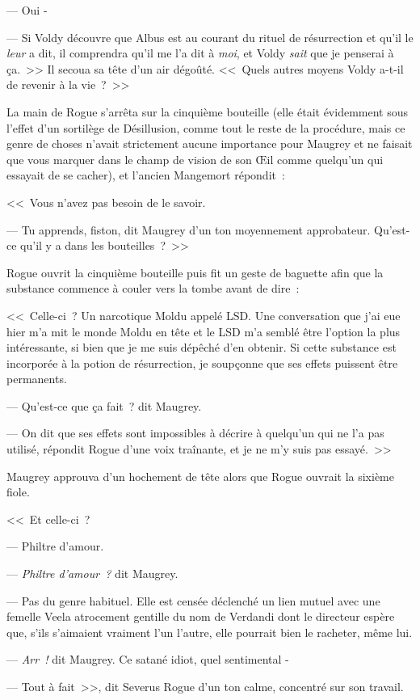--- Oui -

--- Si Voldy découvre que Albus est au courant du rituel de résurrection et qu'il le \emph{leur} a dit, il comprendra qu'il me l'a dit à \emph{moi}, et Voldy \emph{sait} que je penserai à ça.~>> Il secoua sa tête d'un air dégoûté. <<~Quels autres moyens Voldy a-t-il de revenir à la vie~?~>>

La main de Rogue s'arrêta sur la cinquième bouteille (elle était évidemment sous l'effet d'un sortilège de Désillusion, comme tout le reste de la procédure, mais ce genre de choses n'avait strictement aucune importance pour Maugrey et ne faisait que vous marquer dans le champ de vision de son Œil comme quelqu'un qui essayait de se cacher), et l'ancien Mangemort répondit~:

<<~Vous n'avez pas besoin de le savoir.

--- Tu apprends, fiston, dit Maugrey d'un ton moyennement approbateur. Qu'est-ce qu'il y a dans les bouteilles~?~>>

Rogue ouvrit la cinquième bouteille puis fit un geste de baguette afin que la substance commence à couler vers la tombe avant de dire~:

<<~Celle-ci~? Un narcotique Moldu appelé LSD. Une conversation que j'ai eue hier m'a mit le monde Moldu en tête et le LSD m'a semblé être l'option la plus intéressante, si bien que je me suis dépêché d'en obtenir. Si cette substance est incorporée à la potion de résurrection, je soupçonne que ses effets puissent être permanents.

--- Qu'est-ce que ça fait~? dit Maugrey.

--- On dit que ses effets sont impossibles à décrire à quelqu'un qui ne l'a pas utilisé, répondit Rogue d'une voix traînante, et je ne m'y suis pas essayé.~>>

Maugrey approuva d'un hochement de tête alors que Rogue ouvrait la sixième fiole.

<<~Et celle-ci~?

--- Philtre d'amour.

--- \emph{Philtre d'amour~?} dit Maugrey.

--- Pas du genre habituel. Elle est censée déclenché un lien mutuel avec une femelle Veela atrocement gentille du nom de Verdandi dont le directeur espère que, s'ils s'aimaient vraiment l'un l'autre, elle pourrait bien le racheter, même lui.

--- \emph{Arr~!}  dit Maugrey. Ce satané idiot, quel sentimental -

--- Tout à fait~>>, dit Severus Rogue d'un ton calme, concentré sur son travail.


